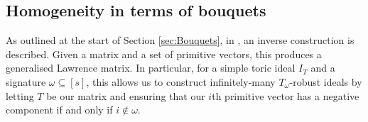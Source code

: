 \documentclass[a4paper, 12pt]{article}
\newcommand{\ZZ}{\mathbb Z}
\theoremstyle{plain}
\theoremstyle{definition}
\theoremstyle{remark}
\begin{document}



\subsection{Homogeneity in terms of bouquets}



As outlined at the start of Section \ref{sec:Bouquets}, in \cite[Theorem 2.1]{petrovic2018bouquet}, an inverse construction is described. Given a matrix and a set of primitive vectors, this produces a generalised Lawrence matrix. In particular, for a simple toric ideal $I_T$ and a signature $\omega \subseteq [s]$, this allows us to construct infinitely-many $T_{\omega}$-robust ideals by letting $T$ be our matrix and ensuring that our $i$th primitive vector has a negative component if and only if $i \not\in \omega$. 
\end{document}
